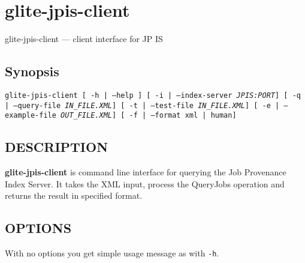 % 
\section{glite-jpis-client}
\label{glitejpisclient}\hypertarget{glitejpisclient}{}%
\label{name}

glite-jpis-client --- client interface for JP IS\label{synopsis}
\subsection*{Synopsis}
\label{id2455104}
\begin{list}{}{\setlength{\itemindent}{-\leftmargin}\setlength{\parsep}{0mm}}
\item\raggedright\texttt{glite-jpis-client [ -h | --help ] [ -i | --index-server  \textit{JPIS:PORT}] [ -q | --query-file  \textit{IN\_FILE.XML}] [ -t | --test-file  \textit{IN\_FILE.XML}] [ -e | --example-file  \textit{OUT\_FILE.XML}] [ -f | --format   {xml | human}]}
\end{list}

\subsection*{DESCRIPTION}
\label{id2417458}

{\bfseries{glite-jpis-client}} is command line interface for querying the Job Provenance Index Server. It takes the XML input, process the QueryJobs operation and returns the result in specified format.

\subsection*{OPTIONS}
\label{id2417597}

With no options you get simple usage message as with {\texttt{{-h}}}.

